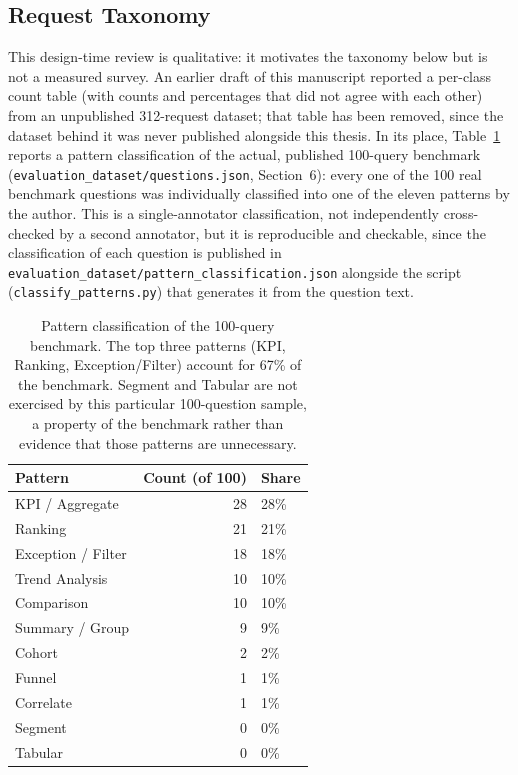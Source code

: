 \documentclass[11pt]{article}
\begin{document}
\subsection{Request Taxonomy}
This design-time review is qualitative: it motivates the taxonomy below but is not a measured survey. An earlier draft of this manuscript reported a per-class count table (with counts and percentages that did not agree with each other) from an unpublished 312-request dataset; that table has been removed, since the dataset behind it was never published alongside this thesis. In its place, Table~\ref{tab:pattern-classification} reports a pattern classification of the actual, published 100-query benchmark (\texttt{evaluation\_dataset/questions.json}, Section~6): every one of the 100 real benchmark questions was individually classified into one of the eleven patterns by the author. This is a single-annotator classification, not independently cross-checked by a second annotator, but it is reproducible and checkable, since the classification of each question is published in \texttt{evaluation\_dataset/pattern\_classification.json} alongside the script (\texttt{classify\_patterns.py}) that generates it from the question text.

\begin{table}[h]
\centering
\begin{tabular}{lrl}
\toprule
\textbf{Pattern} & \textbf{Count (of 100)} & \textbf{Share} \\
\midrule
KPI / Aggregate     & 28 & 28\% \\
Ranking             & 21 & 21\% \\
Exception / Filter  & 18 & 18\% \\
Trend Analysis      & 10 & 10\% \\
Comparison          & 10 & 10\% \\
Summary / Group     &  9 &  9\% \\
Cohort              &  2 &  2\% \\
Funnel              &  1 &  1\% \\
Correlate           &  1 &  1\% \\
Segment             &  0 &  0\% \\
Tabular             &  0 &  0\% \\
\bottomrule
\end{tabular}
\caption{Pattern classification of the 100-query benchmark. The top three patterns (KPI, Ranking, Exception/Filter) account for 67\% of the benchmark. Segment and Tabular are not exercised by this particular 100-question sample, a property of the benchmark rather than evidence that those patterns are unnecessary.}\label{tab:pattern-classification}
\end{table}
\end{document}
